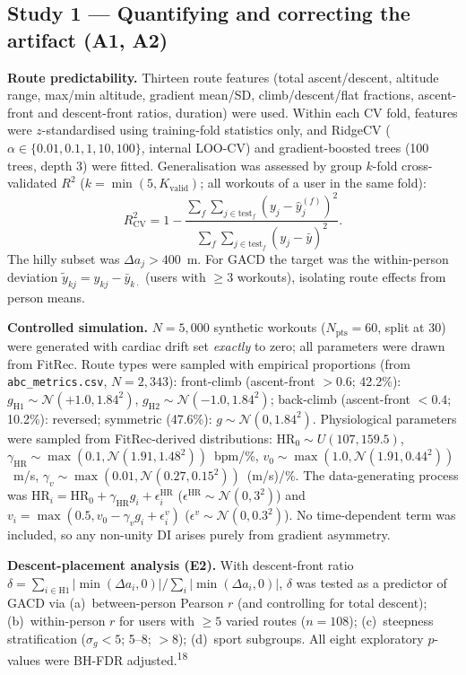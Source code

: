 \documentclass[12pt]{article}
\begin{document}
\subsection{Study 1 --- Quantifying and correcting the artifact (A1, A2)}
\textbf{Route predictability.} Thirteen route features (total
ascent/descent, altitude range, max/min altitude, gradient mean/SD,
climb/descent/flat fractions, ascent-front and descent-front ratios,
duration) were used. Within each CV fold, features were $z$-standardised
using training-fold statistics only, and RidgeCV
($\alpha\in\{0.01,0.1,1,10,100\}$, internal LOO-CV) and gradient-boosted
trees (100 trees, depth 3) were fitted. Generalisation was assessed by
group $k$-fold cross-validated $R^2$ ($k=\min(5,K_{\mathrm{valid}})$; all
workouts of a user in the same fold):
\begin{equation}
  R^2_{\mathrm{CV}}=1-\frac{\sum_{f}\sum_{j\in\mathrm{test}_f}(y_j-\hat y_j^{(f)})^2}
                          {\sum_{f}\sum_{j\in\mathrm{test}_f}(y_j-\bar y)^2}.
  \label{eq:cvr2}
\end{equation}
The hilly subset was $\Delta a_j>400$~m. For GACD the target was the
within-person deviation $\tilde y_{kj}=y_{kj}-\bar y_{k\cdot}$ (users with
$\geq 3$ workouts), isolating route effects from person means.

\textbf{Controlled simulation.} $N=5{,}000$ synthetic workouts
($N_{\mathrm{pts}}=60$, split at 30) were generated with cardiac drift set
\emph{exactly} to zero; all parameters were drawn from FitRec. Route types
were sampled with empirical proportions (from
\texttt{abc\_metrics.csv}, $N=2{,}343$): front-climb (ascent-front $>0.6$;
42.2\%): $g_{\mathrm{H1}}\sim\mathcal N(+1.0,1.84^2)$,
$g_{\mathrm{H2}}\sim\mathcal N(-1.0,1.84^2)$; back-climb (ascent-front
$<0.4$; 10.2\%): reversed; symmetric (47.6\%):
$g\sim\mathcal N(0,1.84^2)$. Physiological parameters were sampled from
FitRec-derived distributions: $\mathrm{HR}_0\sim U(107,159.5)$,
$\gamma_{\mathrm{HR}}\sim\max(0.1,\mathcal N(1.91,1.48^2))$~bpm/\%,
$v_0\sim\max(1.0,\mathcal N(1.91,0.44^2))$~m/s,
$\gamma_v\sim\max(0.01,\mathcal N(0.27,0.15^2))$~(m/s)/\%. The
data-generating process was
$\mathrm{HR}_i=\mathrm{HR}_0+\gamma_{\mathrm{HR}}g_i+\epsilon^{\mathrm{HR}}_i$
($\epsilon^{\mathrm{HR}}\sim\mathcal N(0,3^2)$) and
$v_i=\max(0.5, v_0-\gamma_v g_i+\epsilon^v_i)$
($\epsilon^v\sim\mathcal N(0,0.3^2)$). No time-dependent term was
included, so any non-unity DI arises purely from gradient asymmetry.

\textbf{Descent-placement analysis (E2).} With descent-front ratio
$\delta=\sum_{i\in\mathrm{H1}}|\min(\Delta a_i,0)|/\sum_{i}|\min(\Delta a_i,0)|$,
$\delta$ was tested as a predictor of GACD via (a)~between-person Pearson
$r$ (and controlling for total descent); (b)~within-person $r$ for users
with $\geq 5$ varied routes ($n=108$); (c)~steepness stratification
($\sigma_g<5$; 5--8; $>8$); (d)~sport subgroups. All eight exploratory
$p$-values were BH-FDR adjusted.\textsuperscript{18}
\end{document}
